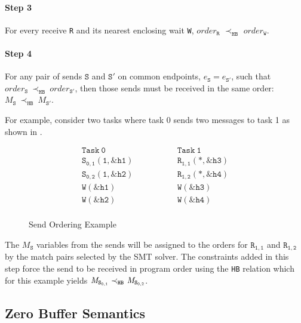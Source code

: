 \paragraph*{Step 3} For every receive \texttt{R} and its nearest
enclosing wait \texttt{W}, $\mathit{order}_\mathtt{R}$
$\prec_\mathtt{HB}$ $\mathit{order}_\mathtt{W}$.

\paragraph*{Step 4} For any pair of sends $\mathtt{S}$ and
$\mathtt{S'}$ on common endpoints, $e_{\mathtt{S}}=e_{\mathtt{S'}}$,
such that
$\mathit{order}_\mathtt{S}\ \mathrm{\prec_\mathtt{HB}}\ \mathit{order}_\mathtt{S'}$,
then those sends must be received in the same order:
$M_{\mathtt{S}}\ \mathrm{\prec_{\mathtt{HB}}}\ M_{\mathtt{S'}}$.

For example, consider two tasks where task 0 sends two messages to
task 1 as shown in .

\begin{figure}[h]
\[
\begin{array}{l|l}
\;\;\;\;\;\;\;\;\mathtt{Task\ 0}\;\;\;\;\;\;\;\; & \;\;\;\;\;\;\;\; \mathtt{Task\ 1}\;\;\;\;\;\;\;\; \\
\hline
\;\;\;\;\;\;\;\;\mathtt{S_{0,1}(1,\&h1)}\;\;\;\;\;\;\;\; & \;\;\;\;\;\;\;\; \mathtt{R_{1,1}(*,\&h3)}\;\;\;\;\;\;\;\; \\
\;\;\;\;\;\;\;\;\mathtt{S_{0,2}(1,\&h2)}\;\;\;\;\;\;\;\; & \;\;\;\;\;\;\;\; \mathtt{R_{1,2}(*,\&h4)}\;\;\;\;\;\;\;\; \\
\;\;\;\;\;\;\;\;\mathtt{W(\&h1)}\;\;\;\;\;\;\;\; & \;\;\;\;\;\;\;\; \mathtt{W(\&h3)}\;\;\;\;\;\;\;\; \\
\;\;\;\;\;\;\;\;\mathtt{W(\&h2)}\;\;\;\;\;\;\;\; & \;\;\;\;\;\;\;\; \mathtt{W(\&h4)}\;\;\;\;\;\;\;\; \\
\end{array}
\]
\caption{Send Ordering Example} \label{fig:step4}
\end{figure}

The $\mathit{M_\mathtt{S}}$ variables from the sends will be assigned to the orders
for $\mathtt{R_{1,1}}$ and $\mathtt{R_{1,2}}$ by the match pairs
selected by the SMT solver. The constraints added in this step force
the send to be received in program order using the \texttt{HB}
relation which for this example yields
$\cfgnt{M}_\mathtt{S_{0,1}}\ \mathrm{\prec_\mathtt{HB}}\ \cfgnt{M}_\mathtt{S_{0,2}}$.

\subsection{Zero Buffer Semantics}

